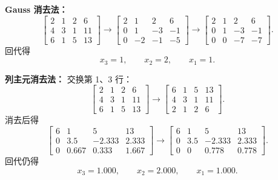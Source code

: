 \documentclass[11pt, a4paper]{ctexart}
\begin{document}
\begin{solution}
    \textbf{Gauss 消去法：}
    \[
        \left[
        \begin{array}{ccc|c}
            2 & 1 & 2 & 6 \\
            4 & 3 & 1 & 11 \\
            6 & 1 & 5 & 13
        \end{array}
        \right]
        \to
        \left[
        \begin{array}{ccc|c}
            2 & 1 & 2 & 6 \\
            0 & 1 & -3 & -1 \\
            0 & -2 & -1 & -5
        \end{array}
        \right]
        \to
        \left[
        \begin{array}{ccc|c}
            2 & 1 & 2 & 6 \\
            0 & 1 & -3 & -1 \\
            0 & 0 & -7 & -7
        \end{array}
        \right].
    \]
    回代得
    \[
        x_3 = 1,\qquad x_2 = 2,\qquad x_1 = 1.
    \]

    \textbf{列主元消去法：}
    交换第 1、3 行：
    \[
        \left[
        \begin{array}{ccc|c}
            2 & 1 & 2 & 6 \\
            4 & 3 & 1 & 11 \\
            6 & 1 & 5 & 13
        \end{array}
        \right]
        \to
        \left[
        \begin{array}{ccc|c}
            6 & 1 & 5 & 13 \\
            4 & 3 & 1 & 11 \\
            2 & 1 & 2 & 6
        \end{array}
        \right].
    \]
    消去后得
    \[
        \left[
        \begin{array}{ccc|c}
            6 & 1 & 5 & 13 \\
            0 & 3.5 & -2.333 & 2.333 \\
            0 & 0.667 & 0.333 & 1.667
        \end{array}
        \right]
        \to
        \left[
        \begin{array}{ccc|c}
            6 & 1 & 5 & 13 \\
            0 & 3.5 & -2.333 & 2.333 \\
            0 & 0 & 0.778 & 0.778
        \end{array}
        \right].
    \]
    回代仍得
    \[
        x_3 = 1.000,\qquad x_2 = 2.000,\qquad x_1 = 1.000.
    \]


\end{solution}
\end{document}
